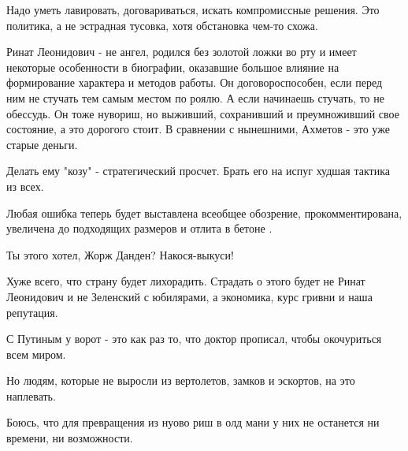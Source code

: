 Надо уметь лавировать, договариваться,  искать компромиссные решения. Это
политика, а не эстрадная тусовка, хотя обстановка чем-то схожа.

Ринат Леонидович - не ангел, родился без золотой ложки во рту и имеет некоторые
особенности в биографии, оказавшие большое влияние на формирование характера и
методов работы. Он договороспособен, если перед ним не стучать тем самым местом
по роялю. А если начинаешь стучать, то не обессудь. Он тоже нувориш, но
выживший, сохранивший и преумноживший свое состояние, а это дорогого стоит. В
сравнении с нынешними,  Ахметов - это уже старые деньги.  

Делать ему "козу" - стратегический просчет. Брать его на испуг худшая тактика
из всех.

Любая ошибка теперь будет выставлена всеобщее обозрение, прокомментирована,
увеличена до подходящих размеров и отлита в бетоне .

Ты этого хотел, Жорж Данден? Накося-выкуси!

Хуже всего, что страну будет лихорадить. Страдать о  этого будет не Ринат
Леонидович и не Зеленский с юбилярами, а экономика, курс гривни и наша
репутация.

С Путиным у ворот - это как раз то, что доктор прописал, чтобы окочуриться всем
миром.

Но людям, которые не выросли из вертолетов, замков и эскортов, на это
наплевать.

Боюсь, что для превращения из нуово риш в олд мани у них не останется ни
времени, ни возможности.

